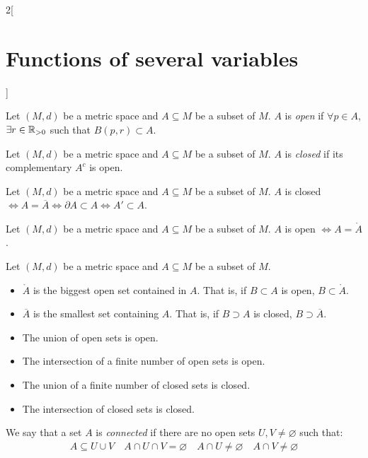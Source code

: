\documentclass[../../../main.tex]{subfiles}
\begin{document}
\begin{multicols}{2}[\section{Functions of several variables}]
\begin{definition}
    Let $(M,d)$ be a metric space and $A\subseteq M$ be a subset of $M$. $A$ is \textit{open} if $\forall p\in A$, $\exists r\in\mathbb{R}_{>0}$ such that $B(p,r)\subset A$.
  \end{definition}
  \begin{definition}
    Let $(M,d)$ be a metric space and $A\subseteq M$ be a subset of $M$. $A$ is \textit{closed} if its complementary $A^c$ is open.
  \end{definition}
  \begin{prop}
    Let $(M,d)$ be a metric space and $A\subseteq M$ be a subset of $M$. $A$ is closed $\iff A=\overline{A}\iff\partial A\subset A\iff A'\subset A$.
  \end{prop}
  \begin{prop}
    Let $(M,d)$ be a metric space and $A\subseteq M$ be a subset of $M$. $A$ is open $\iff A=\mathring A$.
  \end{prop}
  \begin{prop}
    Let $(M,d)$ be a metric space and $A\subseteq M$ be a subset of $M$.
    \begin{itemize}
      \item $\mathring A$ is the biggest open set contained in $A$. That is, if $B\subset A$ is open, $B\subset\mathring A$.
      \item $\overline{A}$ is the smallest set containing $A$. That is, if $B\supset A$ is closed, $B\supset\overline{A}$.
    \end{itemize}
  \end{prop}
  \begin{prop}
    \hfill
    \begin{itemize}
      \item The union of open sets is open.
      \item The intersection of a finite number of open sets is open.
      \item The union of a finite number of closed sets is closed.
      \item The intersection of closed sets is closed.
    \end{itemize}
  \end{prop}
  \begin{definition}
    We say that a set $A$ is \textit{connected} if there are no open sets $U,V\ne\varnothing$ such that:
    \begin{gather*}
      A\subseteq U\cup V\quad A\cap U\cap V=\varnothing\quad A\cap U\ne\varnothing\quad A\cap V\ne\varnothing
    \end{gather*}
  \end{definition}

\end{multicols}
\end{document}

